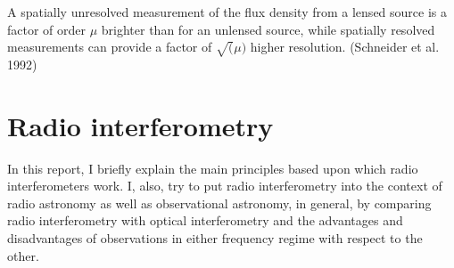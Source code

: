\documentclass[paper=a4, fontsize=11pt]{scrartcl} %
\numberwithin{equation}{section} %
\numberwithin{figure}{section} %
\numberwithin{table}{section} %
\begin{document}
A spatially unresolved measurement of the flux density from a lensed source is a factor of order $\mu$ brighter than for an unlensed source, while spatially resolved measurements can provide a factor of $\sqrt(\mu)$ higher resolution. (Schneider et al. 1992)


\newpage
\section{Radio interferometry}
In this report, I briefly explain the main principles based upon which radio interferometers work. I, also, try to put radio interferometry into the context of radio astronomy as well as observational astronomy, in general, by comparing radio interferometry with optical interferometry and the advantages and disadvantages of observations in either frequency regime with respect to the other.

\end{document}
